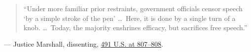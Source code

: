 \documentclass[12pt]{article}
\begin{document}
\begin{quote}
``Under more familiar prior restraints, government officials censor speech `by a simple stroke of the pen' \dots\ Here, it is done by a single turn of a knob. \dots\ Today, the majority enshrines efficacy, but sacrifices free speech.''
\end{quote}
\noindent --- Justice Marshall, dissenting, \href{https://supreme.justia.com/cases/federal/us/491/781/}{491 U.S. at 807--808}.
\end{document}

